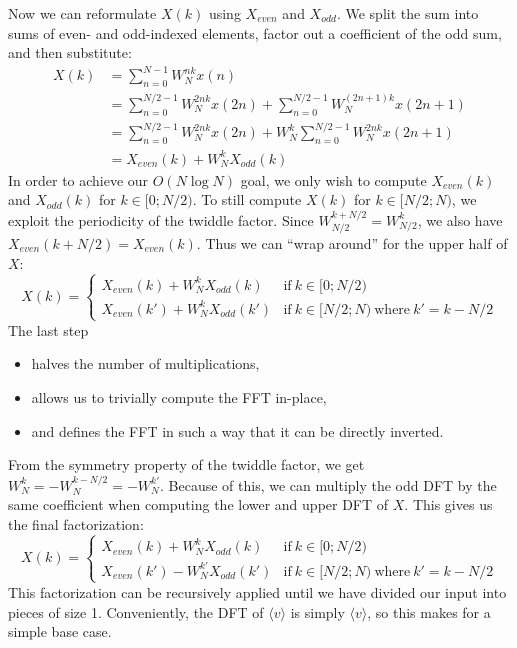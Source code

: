Now we can reformulate $X(k)$ using $X_\textit{even}$ and $X_\textit{odd}$.
We split the sum into sums of even- and odd-indexed elements,
factor out a coefficient of the odd sum,
and then substitute:
\begin{align}
    X(k) &= \sum_{n = 0}^{N - 1} W_N^{nk} x(n) \\
    &= \sum_{n = 0}^{N/2 - 1} W_N^{2nk} x(2n) + \sum_{n = 0}^{N/2 - 1} W_N^{(2n + 1)k} x(2n + 1) \\
    &= \sum_{n = 0}^{N/2 - 1} W_N^{2nk} x(2n) + W_N^k \sum_{n = 0}^{N/2 - 1} W_N^{2nk} x(2n + 1) \\
    &= X_\textit{even}(k) + W_N^k X_\textit{odd}(k)
\end{align}
%
In order to achieve our $O(N \log N)$ goal,
we only wish to compute $X_\textit{even}(k)$ and $X_\textit{odd}(k)$ for $k \in [0;N/2)$.
To still compute $X(k)$ for $k \in [N/2;N)$, we exploit the periodicity of the twiddle factor.
Since $W_{N/2}^{k + N/2} = W_{N/2}^k$, we also have $X_\textit{even}(k + N/2) = X_\textit{even}(k)$.
Thus we can ``wrap around'' for the upper half of $X$:
\begin{equation}
    X(k) =
    \begin{cases}
        X_\textit{even}(k) + W_N^k X_\textit{odd}(k) &\text{if}~k \in [0;N/2) \\
        X_\textit{even}(k') + W_N^{k} X_\textit{odd}(k') &\text{if}~k \in [N/2;N) ~\text{where}~k' = k - N/2
    \end{cases}
\end{equation}
%
The last step
\begin{itemize}
    \item halves the number of multiplications,
    \item allows us to trivially compute the FFT in-place,
    \item and defines the FFT in such a way that it can be directly inverted.
\end{itemize}

From the symmetry property of the twiddle factor, we get $W_N^k = -W_N^{k - N/2} = -W_N^{k'}$.
Because of this,
we can multiply the odd DFT by the same coefficient when computing the lower and upper DFT of $X$.
This gives us the final factorization:
\begin{equation}
    X(k) =
    \begin{cases}
        X_\textit{even}(k) + W_N^k X_\textit{odd}(k) &\text{if}~k \in [0;N/2) \\
        X_\textit{even}(k') - W_N^{k'} X_\textit{odd}(k') &\text{if}~k \in [N/2;N) ~\text{where}~k' = k - N/2
    \end{cases}
\end{equation}
This factorization can be recursively applied
until we have divided our input into pieces of size 1.
Conveniently, the DFT of $\langle v \rangle$ is simply $\langle v \rangle$,
so this makes for a simple base case.


